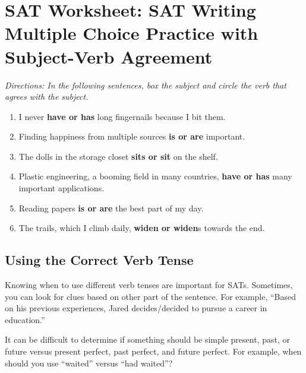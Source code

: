 \section{SAT Worksheet: SAT Writing Multiple Choice Practice with Subject-Verb Agreement}

\textit{Directions: In the following sentences, box the subject and circle the verb that agrees with the subject.}

\begin{enumerate}
\item{I never \textbf{ have or has} long fingernails because I bit them.}


\item{Finding happiness from multiple sources \textbf{is or are} important.}


\item{The dolls in the storage closet \textbf{sits or sit} on the shelf.}


\item{Plastic engineering, a booming field in many countries, \textbf{have or has} many important applications.}


\item{Reading papers \textbf{is or are} the best part of my day.}


\item{The trails, which I climb daily, \textbf{widen or widen}s towards the end.}

\end{enumerate}

\subsection{Using the Correct Verb Tense}

Knowing when to use different verb tenses are important for SATs. Sometimes, you can look for
clues based on other part of the sentence. For example, ``Based on his previous experiences, Jared
decides/decided to pursue a career in education.''

\bigskip
It can be difficult to determine if something should be simple present, past, or future versus present
perfect, past perfect, and future perfect. For example, when should you use ``waited'' versus ``had
waited''?

